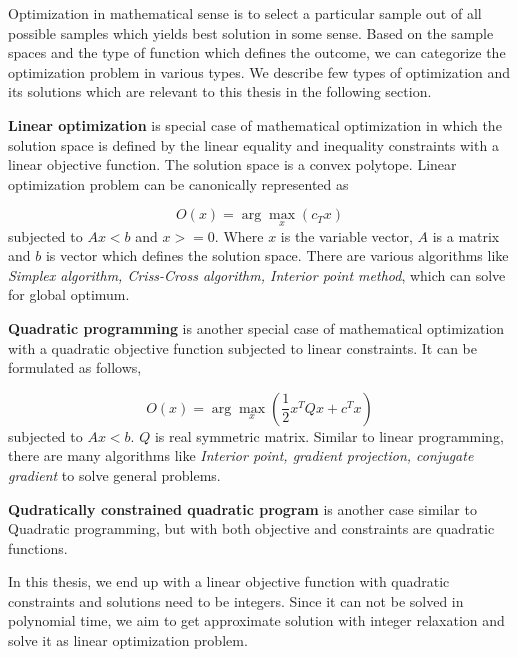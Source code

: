 
Optimization in mathematical sense is to select a particular sample out of all 
possible samples which yields best solution in some sense. Based on the sample
spaces and the type of function which defines the outcome, we can categorize the
optimization problem in various types. We describe few types of optimization and 
its solutions which are relevant to this thesis in the following section.

\textbf{Linear optimization} is special case of mathematical optimization in which the
solution space is defined by the linear equality and inequality constraints with
a linear objective function. The solution space is a convex polytope. Linear
optimization problem can be canonically represented as

\begin{equation}
O(x) = \arg\max_x(c_Tx)
\end{equation}
subjected to $Ax < b$ and $x>=0$. Where $x$ is the variable vector, $A$ is a
matrix and $b$ is vector which defines the solution space. There are various
algorithms like \textit{Simplex algorithm, Criss-Cross algorithm, Interior 
point method}, which can solve for global optimum.

\textbf{Quadratic programming} is another special case of mathematical optimization
with a quadratic objective function subjected to linear constraints. It can be
formulated as follows,

\begin{equation}
O(x) = \arg\max_x{(\frac{1}{2}x^TQx + c^Tx)}
\end{equation}
subjected to $Ax < b$. $Q$ is real symmetric matrix. Similar to linear programming,
there are many algorithms like \textit{Interior point, gradient projection, conjugate
gradient} to solve general problems.

\textbf{Qudratically constrained quadratic program} is another case similar to
Quadratic programming, but with both objective and constraints are quadratic functions.

In this thesis, we end up with a linear objective function with quadratic constraints
and solutions need to be integers. Since it can not be solved in polynomial time, we 
aim to get approximate solution with integer relaxation and solve it as linear 
optimization problem.
